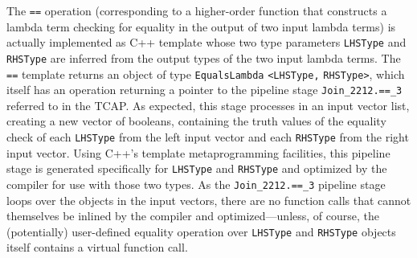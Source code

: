 \noindent The \texttt{==} 
operation (corresponding to a higher-order function that
constructs a lambda term checking for equality in the output of two input lambda terms) is actually implemented as C++ template
whose two type parameters \texttt{LHSType} and \texttt{RHSType} are inferred from
the output types of the two input lambda terms. 
The \texttt{==} template returns an object of type \texttt{EqualsLambda} \texttt{<LHSType,} \texttt{RHSType>}, which
itself has an operation returning a pointer to the pipeline stage \texttt{Join\_2212.==\_3} referred to in the TCAP.
As expected, this stage processes in an input vector list,
creating a new vector of booleans, containing the truth values of the equality check of each \texttt{LHSType} from the left
input vector and each \texttt{RHSType} from the right input vector.
Using C++'s template metaprogramming facilities, this 
pipeline stage is generated specifically for \texttt{LHSType} and \texttt{RHSType} and optimized by the compiler for use with those
two types.  
As the \texttt{Join\_2212.==\_3} pipeline stage loops over the objects in the input vectors, 
there are no function calls that cannot themselves be inlined by the compiler
and optimized---unless, of course, the (potentially) user-defined equality operation over \texttt{LHSType} and \texttt{RHSType}
objects itself contains a virtual function call.

